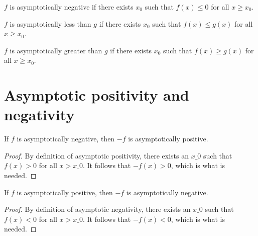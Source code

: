\begin{definition}
    \label{def:asymp_nonneg}
    \leanok
    $f$ is asymptotically negative if there exists $x_0$ such that $f(x) \le 0$
    for all $x \ge x_0$.

\end{definition}

\begin{definition} 
    \label{def:asymp_le} 
    \leanok
    $f$ is asymptotically less than $g$ if there exists $x_0$ such that
    $f(x) \le g(x)$ for all $x \ge x_0$.

\end{definition}

\begin{definition}
    \label{def:asymp_ge}
    \leanok
    $f$ is asymptotically greater than $g$ if there exists $x_0$ such that
    $f(x) \ge g(x)$ for all $x \ge x_0$.

\end{definition}


\section{Asymptotic positivity and negativity}

\begin{lemma}
    \label{lemma:asymp_neg_of_pos}
    \leanok
    If $f$ is asymptotically negative, then $-f$ is asymptotically positive.
\end{lemma}

\begin{proof}
    \leanok
    By definition of asymptotic positivity, there exists an $x\_0$ such that $f(x) > 0$
    for all $x > x\_0$. It follows that $-f(x) > 0$, which is what is needed.
\end{proof}

\begin{lemma}
    \label{lemma:asymp_pos_of_neg}
    \leanok
    If $f$ is asymptotically positive, then $-f$ is asymptotically negative.
\end{lemma}

\begin{proof}
    \leanok
    By definition of asymptotic negativity, there exists an $x\_0$ such that $f(x) < 0$
    for all $x > x\_0$. It follows that $-f(x) < 0$, which is what is needed.
\end{proof}


